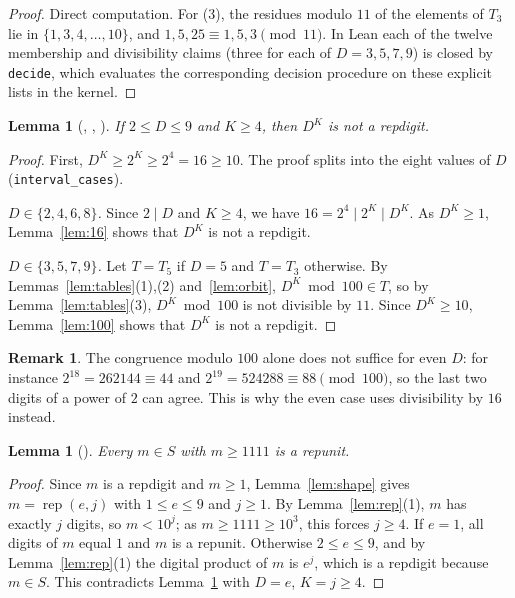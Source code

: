 \documentclass[11pt]{amsart}
\theoremstyle{plain}
\newtheorem{lemma}[theorem]{Lemma}
\theoremstyle{definition}
\newtheorem{remark}[theorem]{Remark}
\newcommand{\rep}{\operatorname{rep}}
\begin{document}
\begin{proof}
Direct computation. For (3), the residues modulo $11$ of the elements of $T_3$ lie in $\{1,3,4,\dots,10\}$, and $1,5,25\equiv1,5,3\pmod{11}$. In Lean each of the twelve membership and divisibility claims (three for each of $D=3,5,7,9$) is closed by \texttt{decide}, which evaluates the corresponding decision procedure on these explicit lists in the kernel.
\end{proof}

\begin{lemma}[, , ]\label{lem:pow}
If $2\le D\le9$ and $K\ge4$, then $D^K$ is not a repdigit.
\end{lemma}

\begin{proof}
First, $D^K\ge2^K\ge2^4=16\ge10$. The proof splits into the eight values of $D$ (\texttt{interval\_cases}).

\emph{$D\in\{2,4,6,8\}$.} Since $2\mid D$ and $K\ge4$, we have $16=2^4\mid 2^K\mid D^K$. As $D^K\ge1$, Lemma~\ref{lem:16} shows that $D^K$ is not a repdigit.

\emph{$D\in\{3,5,7,9\}$.} Let $T=T_5$ if $D=5$ and $T=T_3$ otherwise. By Lemmas~\ref{lem:tables}(1),(2) and~\ref{lem:orbit}, $D^K\bmod100\in T$, so by Lemma~\ref{lem:tables}(3), $D^K\bmod100$ is not divisible by $11$. Since $D^K\ge10$, Lemma~\ref{lem:100} shows that $D^K$ is not a repdigit.
\end{proof}

\begin{remark}
The congruence modulo $100$ alone does not suffice for even $D$: for instance $2^{18}=262144\equiv44$ and $2^{19}=524288\equiv88\pmod{100}$, so the last two digits of a power of $2$ can agree. This is why the even case uses divisibility by $16$ instead.
\end{remark}

\begin{lemma}[]\label{lem:term}
Every $m\in S$ with $m\ge1111$ is a repunit.
\end{lemma}

\begin{proof}
Since $m$ is a repdigit and $m\ge1$, Lemma~\ref{lem:shape} gives $m=\rep(e,j)$ with $1\le e\le9$ and $j\ge1$. By Lemma~\ref{lem:rep}(1), $m$ has exactly $j$ digits, so $m<10^j$; as $m\ge1111\ge10^3$, this forces $j\ge4$. If $e=1$, all digits of $m$ equal $1$ and $m$ is a repunit. Otherwise $2\le e\le9$, and by Lemma~\ref{lem:rep}(1) the digital product of $m$ is $e^j$, which is a repdigit because $m\in S$. This contradicts Lemma~\ref{lem:pow} with $D=e$, $K=j\ge4$.
\end{proof}
\end{document}
